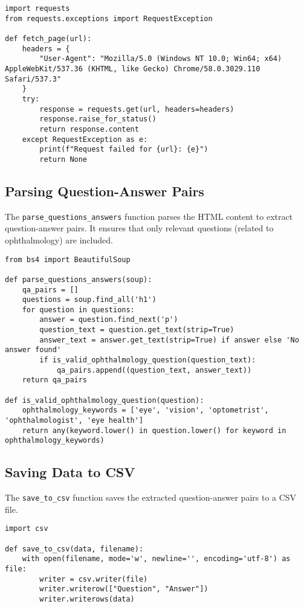 \documentclass[a4paper,12pt]{article}
\begin{document}
\begin{lstlisting}
import requests
from requests.exceptions import RequestException

def fetch_page(url):
    headers = {
        "User-Agent": "Mozilla/5.0 (Windows NT 10.0; Win64; x64) AppleWebKit/537.36 (KHTML, like Gecko) Chrome/58.0.3029.110 Safari/537.3"
    }
    try:
        response = requests.get(url, headers=headers)
        response.raise_for_status()
        return response.content
    except RequestException as e:
        print(f"Request failed for {url}: {e}")
        return None
\end{lstlisting}

\subsection{Parsing Question-Answer Pairs}
The \texttt{parse\_questions\_answers} function parses the HTML content to extract question-answer pairs. It ensures that only relevant questions (related to ophthalmology) are included.

\begin{lstlisting}
from bs4 import BeautifulSoup

def parse_questions_answers(soup):
    qa_pairs = []
    questions = soup.find_all('h1')
    for question in questions:
        answer = question.find_next('p')
        question_text = question.get_text(strip=True)
        answer_text = answer.get_text(strip=True) if answer else 'No answer found'
        if is_valid_ophthalmology_question(question_text):
            qa_pairs.append((question_text, answer_text))
    return qa_pairs

def is_valid_ophthalmology_question(question):
    ophthalmology_keywords = ['eye', 'vision', 'optometrist', 'ophthalmologist', 'eye health']
    return any(keyword.lower() in question.lower() for keyword in ophthalmology_keywords)
\end{lstlisting}

\subsection{Saving Data to CSV}
The \texttt{save\_to\_csv} function saves the extracted question-answer pairs to a CSV file.

\begin{lstlisting}
import csv

def save_to_csv(data, filename):
    with open(filename, mode='w', newline='', encoding='utf-8') as file:
        writer = csv.writer(file)
        writer.writerow(["Question", "Answer"])
        writer.writerows(data)
\end{lstlisting}
\end{document}
